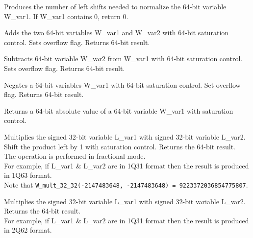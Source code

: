 
Produces the number of left shifts needed to normalize the 64-bit variable W\_var1. 
If W\_var1 contains 0, return 0.


Adds the two 64-bit variables W\_var1 and W\_var2 with 64-bit saturation control. 
Sets overflow flag. Returns 64-bit result.


Subtracts 64-bit variable W\_var2 from W\_var1 with 64-bit saturation control. 
Sets overflow flag. Returns 64-bit result.


Negates a 64-bit variables W\_var1 with 64-bit saturation control. 
Set overflow flag. Returns 64-bit result.


Returns a 64-bit absolute value of a 64-bit variable W\_var1 with saturation control.


Multiplies the signed 32-bit variable L\_var1 with signed 32-bit variable L\_var2.
Shift the product left by 1 with saturation control.
Returns the 64-bit result.\\
The operation is performed in fractional mode.\\
For example, if L\_var1 \& L\_var2 are in 1Q31 format then the result is produced in 1Q63 format.\\
Note that {\tt W\_mult\_32\_32(-2147483648, -2147483648) = 9223372036854775807}.


Multiplies the signed 32-bit variable L\_var1 with signed 32-bit variable L\_var2. 
Returns the 64-bit result.\\
For example, if L\_var1 \& L\_var2 are in 1Q31 format then the result is produced in 2Q62 format.


